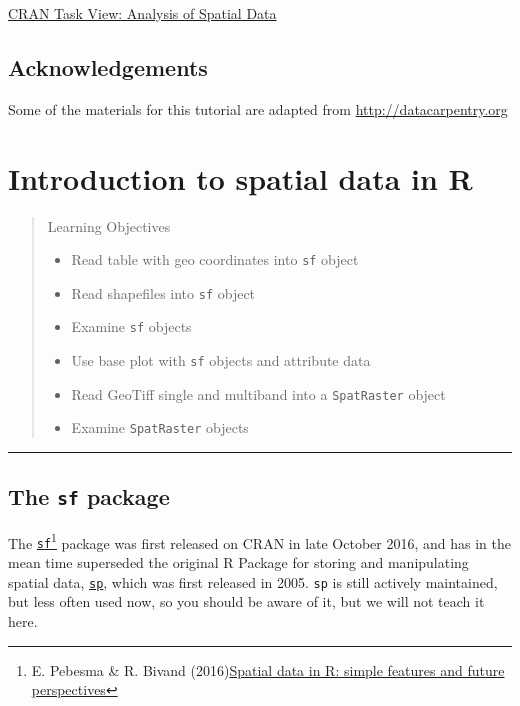 \documentclass[
]{book}
\providecommand{\tightlist}{%
  \setlength{\itemsep}{0pt}\setlength{\parskip}{0pt}}
\begin{document}
\href{https://CRAN.R-project.org/view=Spatial}{CRAN Task View: Analysis of Spatial Data}

\section*{Acknowledgements}\label{acknowledgements}

Some of the materials for this tutorial are adapted from \url{http://datacarpentry.org}

\chapter{Introduction to spatial data in R}\label{intro}

\begin{quote}
Learning Objectives

\begin{itemize}
\tightlist
\item
  Read table with geo coordinates into \texttt{sf} object
\item
  Read shapefiles into \texttt{sf} object
\item
  Examine \texttt{sf} objects
\item
  Use base plot with \texttt{sf} objects and attribute data
\item
  Read GeoTiff single and multiband into a \texttt{SpatRaster} object
\item
  Examine \texttt{SpatRaster} objects
\end{itemize}
\end{quote}

\begin{center}\rule{0.5\linewidth}{0.5pt}\end{center}

\section{\texorpdfstring{The \texttt{sf} package}{The sf package}}\label{the-sf-package}

The \href{https://cran.r-project.org/package=sf}{\texttt{sf}}\footnote{E. Pebesma \& R. Bivand (2016)\href{http://pebesma.staff.ifgi.de/pebesma_sfr.pdf}{Spatial data in R: simple features and
  future perspectives}} package was first released on CRAN in late October 2016, and has in the mean time superseded the original R Package for storing and manipulating spatial data, \href{https://CRAN.R-project.org/package=sp}{\texttt{sp}}, which was first released in 2005. \texttt{sp} is still actively maintained, but less often used now, so you should be aware of it, but we will not teach it here.
\end{document}
